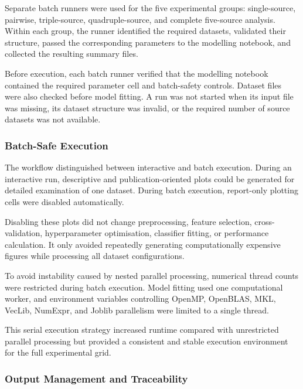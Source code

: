 \documentclass[12pt,twocolumn]{article}
\begin{document}
Separate batch runners were used for the five experimental groups:
single-source, pairwise, triple-source, quadruple-source, and complete
five-source analysis. Within each group, the runner identified the
required datasets, validated their structure, passed the corresponding
parameters to the modelling notebook, and collected the resulting
summary files.

Before execution, each batch runner verified that the modelling
notebook contained the required parameter cell and batch-safety
controls. Dataset files were also checked before model fitting. A run
was not started when its input file was missing, its dataset structure
was invalid, or the required number of source datasets was not
available.







\subsubsection{Batch-Safe Execution}
\label{subsubsec:batch_safe_execution}

The workflow distinguished between interactive and batch execution.
During an interactive run, descriptive and publication-oriented plots
could be generated for detailed examination of one dataset. During
batch execution, report-only plotting cells were disabled
automatically.

Disabling these plots did not change preprocessing, feature selection,
cross-validation, hyperparameter optimisation, classifier fitting, or
performance calculation. It only avoided repeatedly generating
computationally expensive figures while processing all dataset
configurations.

To avoid instability caused by nested parallel processing, numerical
thread counts were restricted during batch execution. Model fitting
used one computational worker, and environment variables controlling
OpenMP, OpenBLAS, MKL, VecLib, NumExpr, and Joblib parallelism were
limited to a single thread.

This serial execution strategy increased runtime compared with
unrestricted parallel processing but provided a consistent and stable
execution environment for the full experimental grid.






\subsubsection{Output Management and Traceability}
\label{subsubsec:output_management}
\end{document}
